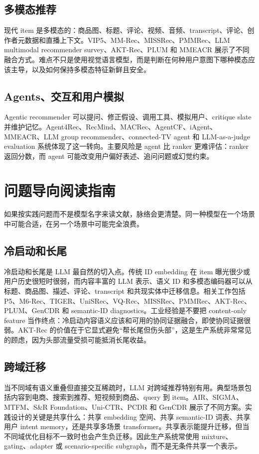 \documentclass[UTF8,fontset=fandol,11pt]{ctexart}
\begin{document}
\subsection{多模态推荐}

现代 item 是多模态的：商品图、标题、评论、视频、音频、transcript、评论、创作者元数据和直播上下文。VIP5、MM-Rec、MISSRec、PMMRec、LLM multimodal recommender survey、AKT-Rec、PLUM 和 MMEACR 展示了不同融合方式。难点不只是使用视觉语言模型，而是判断在何种用户意图下哪种模态应该主导，以及如何保持多模态特征新鲜且安全。

\subsection{Agents、交互和用户模拟}

Agentic recommender 可以提问、修正假设、调用工具、模拟用户、critique slate 并维护记忆。Agent4Rec、RecMind、MACRec、AgentCF、iAgent、MMEACR、LLM group recommender、connected-TV agent 和 LLM-as-a-judge evaluation 系统体现了这一转向。主要风险是 agent 比 ranker 更难评估：ranker 返回分数，而 agent 可能改变用户偏好表述、追问问题或幻觉约束。

\section{问题导向阅读指南}

如果按实践问题而不是模型名字来读文献，脉络会更清楚。同一种模型在一个场景中可能合适，在另一个场景中可能完全浪费。

\subsection{冷启动和长尾}

冷启动和长尾是 LLM 最自然的切入点。传统 ID embedding 在 item 曝光很少或用户历史很短时很弱，而内容丰富的 LLM 表示、语义 ID 和多模态编码器可以从标题、商品图、描述、评论、transcript 和共现实体中迁移信息。相关工作包括 P5、M6-Rec、TIGER、UniSRec、VQ-Rec、MISSRec、PMMRec、AKT-Rec、PLUM、GenCDR 和 semantic-ID diagnostics。工业经验是不要把 content-only feature 当作终点：冷启动内容语义应该和可用的协同证据融合，即使协同证据很弱。AKT-Rec 的价值在于它显式避免“帮长尾但伤头部”，这是生产系统非常常见的顾虑，因为头部流量受损可能抵消长尾收益。

\subsection{跨域迁移}

当不同域有语义重叠但直接交互稀疏时，LLM 对跨域推荐特别有用。典型场景包括内容到电商、搜索到推荐、短视频到商品、query 到 item。AIR、SIGMA、MTFM、S\&R Foundation、Uni-CTR、PCDR 和 GenCDR 展示了不同方案。实践设计的关键是共享什么：共享 embedding 空间、共享 semantic-ID 词表、共享用户 intent memory，还是共享多场景 transformer。共享表示能提升迁移，但当不同域优化目标不一致时也会产生负迁移。因此生产系统常使用 mixture、gating、adapter 或 scenario-specific subgraph，而不是无条件共享一个表示。
\end{document}

